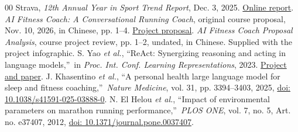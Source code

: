 \documentclass[conference]{IEEEtran}
\begin{document}
\begin{thebibliography}{00}
 Strava, \emph{12th Annual Year in Sport Trend Report}, Dec. 3, 2025. \href{https://press.strava.com/en-gb/articles/strava-releases-12th-annual-year-in-sport-trend-report-2025}{Online report}.
 \emph{AI Fitness Coach: A Conversational Running Coach}, original course proposal, Nov. 10, 2026, in Chinese, pp. 1--4. \href{https://github.com/HitomiHuang/DIC3-AI-Fitness-Coach/blob/main/myplan/proposal.pdf}{Project proposal}.
 \emph{AI Fitness Coach Proposal Analysis}, course project review, pp. 1--2, undated, in Chinese. Supplied with the project infographic.
 S. Yao \emph{et al.}, \textquotedblleft ReAct: Synergizing reasoning and acting in language models,\textquotedblright\ in \emph{Proc. Int. Conf. Learning Representations}, 2023. \href{https://react-lm.github.io/}{Project and paper}.
 J. Khasentino \emph{et al.}, \textquotedblleft A personal health large language model for sleep and fitness coaching,\textquotedblright\ \emph{Nature Medicine}, vol. 31, pp. 3394--3403, 2025, \href{https://doi.org/10.1038/s41591-025-03888-0}{doi: 10.1038/s41591-025-03888-0}.
 N. El Helou \emph{et al.}, \textquotedblleft Impact of environmental parameters on marathon running performance,\textquotedblright\ \emph{PLOS ONE}, vol. 7, no. 5, Art. no. e37407, 2012, \href{https://doi.org/10.1371/journal.pone.0037407}{doi: 10.1371/journal.pone.0037407}.
\end{thebibliography}
\end{document}
